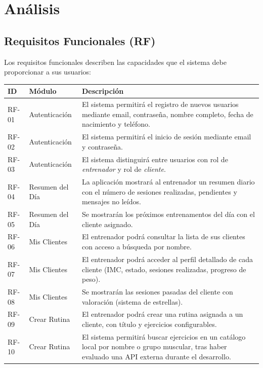\chapter{Análisis}
\label{ch:analisis}

\section{Requisitos Funcionales (RF)}

Los requisitos funcionales describen las capacidades que el sistema debe proporcionar a sus usuarios:

\begin{longtable}{@{}p{1.5cm}p{4cm}p{8.5cm}@{}}
\toprule
\textbf{ID} & \textbf{Módulo} & \textbf{Descripción} \\
\midrule
\endhead
RF-01 & Autenticación & El sistema permitirá el registro de nuevos usuarios mediante email, contraseña, nombre completo, fecha de nacimiento y teléfono. \\
RF-02 & Autenticación & El sistema permitirá el inicio de sesión mediante email y contraseña. \\
RF-03 & Autenticación & El sistema distinguirá entre usuarios con rol de \textit{entrenador} y rol de \textit{cliente}. \\
RF-04 & Resumen del Día & La aplicación mostrará al entrenador un resumen diario con el número de sesiones realizadas, pendientes y mensajes no leídos. \\
RF-05 & Resumen del Día & Se mostrarán los próximos entrenamentos del día con el cliente asignado. \\
RF-06 & Mis Clientes & El entrenador podrá consultar la lista de sus clientes con acceso a búsqueda por nombre. \\
RF-07 & Mis Clientes & El entrenador podrá acceder al perfil detallado de cada cliente (IMC, estado, sesiones realizadas, progreso de peso). \\
RF-08 & Mis Clientes & Se mostrarán las sesiones pasadas del cliente con valoración (sistema de estrellas). \\
RF-09 & Crear Rutina & El entrenador podrá crear una rutina asignada a un cliente, con título y ejercicios configurables. \\
RF-10 & Crear Rutina & El sistema permitirá buscar ejercicios en un catálogo local por nombre o grupo muscular, tras haber evaluado una API externa durante el desarrollo. \\

\end{longtable}
